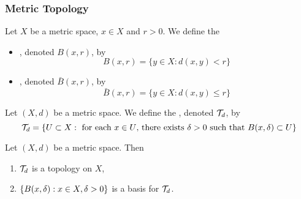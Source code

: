 \documentclass{book}
\begin{document}
\subsubsection{Metric Topology}

\begin{defn} 
	Let $X$ be a metric space, $x \in X$ and $r > 0$. We define the 
	\begin{itemize}
		\item {}, denoted $B(x, r)$, by $$B(x, r) = \{y \in X: d(x,y) < r\}$$
		\item {}, denoted $\bar{B}(x, r)$, by $$\bar{B}(x, r) = \{y \in X: d(x,y) \leq r\}$$
	\end{itemize}
\end{defn}

\begin{defn} 
	Let $(X,d)$ be a metric space. We define the , denoted $\mathcal{T}_d$, by $$\mathcal{T}_d = \{U \subset X: \text{ for each $x \in U$, there exists $\delta > 0$ such that $B(x, \delta) \subset U$}\}$$
\end{defn}

\begin{ex} 
	Let $(X,d)$ be a metric space. Then 
	\begin{enumerate}
		\item $\mathcal{T}_d$ is a topology on $X$,
		\item $\{B(x, \delta): x \in X, \delta >0\}$ is a basis for $\mathcal{T}_d$.
	\end{enumerate}
\end{ex}
\end{document}
